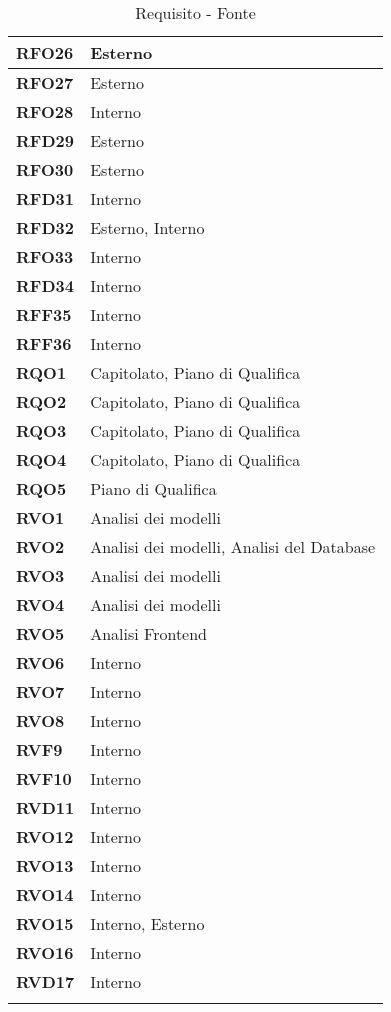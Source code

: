 \begin{longtable}{|>{\centering\arraybackslash}m{}|>{\centering\arraybackslash}m{}|}
	\textbf{RFO26}            & Esterno\\\hline
	\textbf{RFO27}            & Esterno\\\hline
	\textbf{RFO28}            & Interno\\\hline
	\textbf{RFD29}            & Esterno\\\hline
	\textbf{RFO30}            & Esterno\\\hline
	\textbf{RFD31}            & Interno\\\hline
	\textbf{RFD32}            & Esterno, Interno\\\hline
	\textbf{RFO33}            & Interno\\\hline
	\textbf{RFD34}            & Interno\\\hline
	\textbf{RFF35}            & Interno\\\hline
	\textbf{RFF36}            & Interno\\\hline
	\textbf{RQO1}            & Capitolato, Piano di Qualifica\\\hline
	\textbf{RQO2}            & Capitolato, Piano di Qualifica\\\hline
	\textbf{RQO3}            & Capitolato, Piano di Qualifica\\\hline
	\textbf{RQO4}            & Capitolato, Piano di Qualifica\\\hline
	\textbf{RQO5}            & Piano di Qualifica\\\hline
	\textbf{RVO1}			 & Analisi dei modelli\\\hline
	\textbf{RVO2}			 & Analisi dei modelli, Analisi del Database\\\hline
	\textbf{RVO3}			 & Analisi dei modelli\\\hline
	\textbf{RVO4}			 & Analisi dei modelli\\\hline
	\textbf{RVO5}			 & Analisi Frontend\\\hline
	\textbf{RVO6}			 & Interno\\\hline
	\textbf{RVO7}			 & Interno\\\hline
	\textbf{RVO8}			 & Interno\\\hline
	\textbf{RVF9}			 & Interno\\\hline
	\textbf{RVF10}			 & Interno\\\hline
	\textbf{RVD11}			 & Interno\\\hline
	\textbf{RVO12}			 & Interno\\\hline
	\textbf{RVO13}			 & Interno\\\hline
	\textbf{RVO14}			 & Interno\\\hline
	\textbf{RVO15}			 & Interno, Esterno\\\hline
	\textbf{RVO16}			 & Interno\\\hline
	\textbf{RVD17}			 & Interno\\\hline
	\caption{Requisito - Fonte}
\end{longtable}
